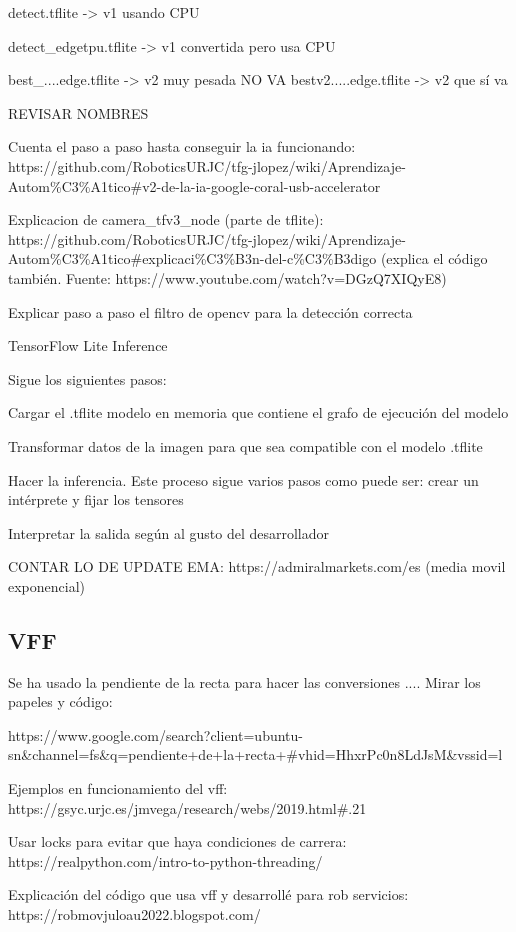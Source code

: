 detect.tflite -> v1 usando CPU

detect\_edgetpu.tflite -> v1 convertida pero usa CPU

best\_....edge.tflite -> v2 muy pesada NO VA
bestv2.....edge.tflite -> v2 que sí va 

REVISAR NOMBRES 


Cuenta el paso a paso hasta conseguir la ia funcionando: https://github.com/RoboticsURJC/tfg-jlopez/wiki/Aprendizaje-Autom\%C3\%A1tico\#v2-de-la-ia-google-coral-usb-accelerator 

Explicacion de camera\_tfv3\_node (parte de tflite): https://github.com/RoboticsURJC/tfg-jlopez/wiki/Aprendizaje-Autom\%C3\%A1tico\#explicaci\%C3\%B3n-del-c\%C3\%B3digo (explica el código también. Fuente: https://www.youtube.com/watch?v=DGzQ7XIQyE8)


Explicar paso a paso el filtro de opencv para la detección correcta


TensorFlow Lite Inference

Sigue los siguientes pasos:

Cargar el .tflite modelo en memoria que contiene el grafo de ejecución del modelo

Transformar datos de la imagen para que sea compatible con el modelo .tflite

Hacer la inferencia. Este proceso sigue varios pasos como puede ser: crear un intérprete y fijar los tensores

Interpretar la salida según al gusto del desarrollador



CONTAR LO DE UPDATE EMA: https://admiralmarkets.com/es  (media movil exponencial)


\subsection{VFF}
\label{subsec:softwarevff}

Se ha usado la pendiente de la recta para hacer las conversiones .... Mirar los papeles y código: 

https://www.google.com/search?client=ubuntu-sn\&channel=fs\&q=pendiente+de+la+recta+#vhid=HhxrPc0n8LdJsM\&vssid=l

Ejemplos en funcionamiento del vff:
https://gsyc.urjc.es/jmvega/research/webs/2019.html#.21


Usar locks para evitar que haya condiciones de carrera: https://realpython.com/intro-to-python-threading/


Explicación del código que usa vff y desarrollé para rob servicios: https://robmovjuloau2022.blogspot.com/

